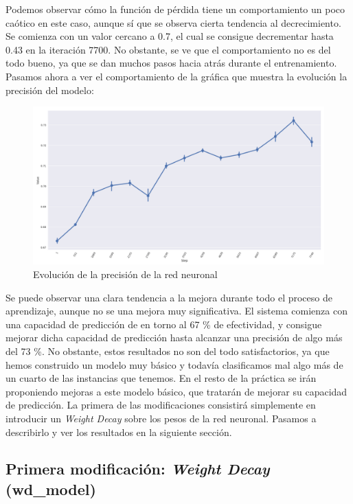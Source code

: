 \documentclass[11pt]{article}
\theoremstyle{plain}
\theoremstyle{definition}
\begin{document}
Podemos observar cómo la función de pérdida tiene un comportamiento un
poco caótico en este caso, aunque sí que se observa cierta tendencia
al decrecimiento. Se comienza con un valor cercano a 0.7, el cual se
consigue decrementar hasta 0.43 en la iteración 7700. No obstante, se
ve que el comportamiento no es del todo bueno, ya que se dan muchos
pasos hacia atrás durante el entrenamiento. Pasamos ahora a ver el
comportamiento de la gráfica que muestra la evolución la precisión del
modelo:

\begin{figure}[H]
  \centering \includegraphics[width=.95\textwidth]{imgs/accuracy_base}
  \caption{Evolución de la precisión de la red neuronal}
\end{figure}

Se puede observar una clara tendencia a la mejora durante todo el
proceso de aprendizaje, aunque no se una mejora muy significativa. El
sistema comienza con una capacidad de predicción de en torno al 67 \%
de efectividad, y consigue mejorar dicha capacidad de predicción hasta
alcanzar una precisión de algo más del 73 \%. No obstante, estos
resultados no son del todo satisfactorios, ya que hemos construido un
modelo muy básico y todavía clasificamos mal algo más de un cuarto de
las instancias que tenemos. En el resto de la práctica se irán
proponiendo mejoras a este modelo básico, que tratarán de mejorar su
capacidad de predicción. La primera de las modificaciones consistirá
simplemente en introducir un \textit{Weight Decay} sobre los pesos de
la red neuronal. Pasamos a describirlo y ver los resultados en la
siguiente sección.

\subsection{Primera modificación: \textit{Weight Decay} (wd\_model)}
\end{document}
